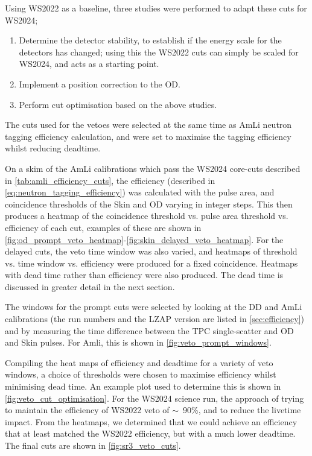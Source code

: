 Using WS2022 as a baseline, three studies were performed to adapt these cuts for WS2024;
\begin{enumerate}
	\item Determine the detector stability, to establish if the energy scale for the detectors has changed; using this the WS2022 cuts can simply be scaled for WS2024, and acts as a starting point.
	\item Implement a position correction to the OD.
	\item Perform cut optimisation based on the above studies.
\end{enumerate}
The cuts used for the vetoes were selected at the same time as AmLi neutron tagging efficiency calculation, and were set to maximise the tagging efficiency whilst reducing deadtime.

On a skim of the AmLi calibrations which pass the WS2024 core-cuts described in \autoref{tab:amli_efficiency_cuts}, the efficiency (described in \autoref{eq:neutron_tagging_efficiency}) was calculated with the pulse area, and coincidence thresholds of the Skin and OD varying in integer steps.
This then produces a heatmap of the coincidence threshold vs. pulse area threshold vs. efficiency of each cut, examples of these are shown in \autoref{fig:od_prompt_veto_heatmap}-\ref{fig:skin_delayed_veto_heatmap}.
For the delayed cuts, the veto time window was also varied, and heatmaps of threshold vs. time window vs. efficiency were produced for a fixed coincidence. Heatmaps with dead time rather than efficiency were also produced. The dead time is discussed in greater detail in the next section.

The windows for the prompt cuts were selected by looking at the DD and AmLi calibrations (the run numbers and the LZAP version are listed in \autoref{sec:efficiency}) and by measuring the time difference between the TPC single-scatter and OD and Skin pulses.
For Amli, this is shown in \autoref{fig:veto_prompt_windows}.

Compiling the heat maps of efficiency and deadtime for a variety of veto windows, a choice of thresholds were chosen to maximise efficiency whilst minimising dead time.
An example plot used to determine this is shown in \autoref{fig:veto_cut_optimisation}.
For the WS2024 science run, the approach of trying to maintain the efficiency of WS2022 veto of $\sim$~90\%, and to reduce the livetime impact.
From the heatmaps, we determined that we could achieve an efficiency that at least matched the WS2022 efficiency, but with a much lower deadtime.
The final cuts are shown in \autoref{fig:sr3_veto_cuts}.

